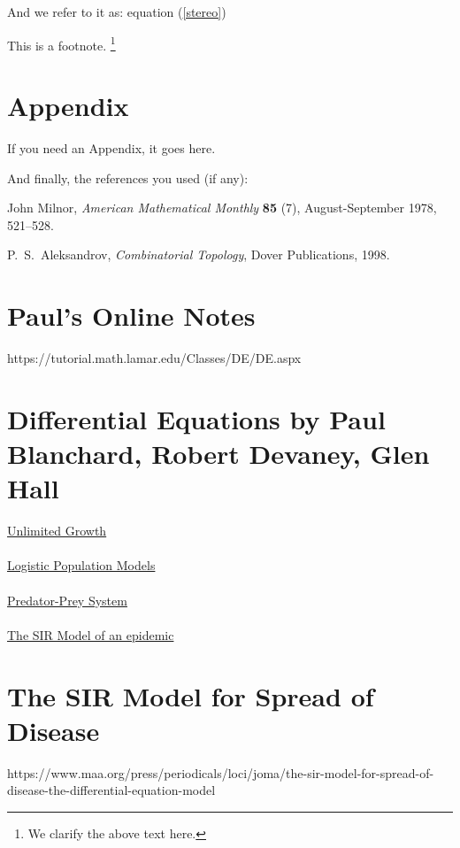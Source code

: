 \documentclass{amsart}
\theoremstyle{definition}
\numberwithin{equation}{section}
\begin{document}
\begin{sansmath}
  And we refer to it as: equation (\ref{stereo})

This is a footnote.
    \footnote{We clarify the above text here.}

    \medskip


\section{Appendix}

If you need an Appendix, it goes here.

\bigskip



And finally, the references you used (if any):


\begin{thebibliography}{12}

John Milnor, {\it
 American Mathematical Monthly}
    {\bf 85} (7), August-September 1978, 521--528.

 \smallskip

    P.~S.~Aleksandrov, {\it Combinatorial Topology},
    Dover Publications, 1998.


\end{thebibliography}


\newpage
\section{Paul's Online Notes}
https://tutorial.math.lamar.edu/Classes/DE/DE.aspx\\
\lipsum[0-2]

\section{Differential Equations by Paul Blanchard, Robert Devaney, Glen Hall}
\underline{Unlimited Growth}\\ %
\lipsum[2-4]\\
\underline{Logistic Population Models}\\ %
\lipsum[4-6]\\
\underline{Predator-Prey System}\\ %
\lipsum[6-8]\\
\underline{The SIR Model of an epidemic}\\ %
\lipsum[8-10]

\section{The SIR Model for Spread of Disease}
https://www.maa.org/press/periodicals/loci/joma/the-sir-model-for-spread-of-disease-the-differential-equation-model\\
\lipsum[0-2]


\end{sansmath}
\end{document}
